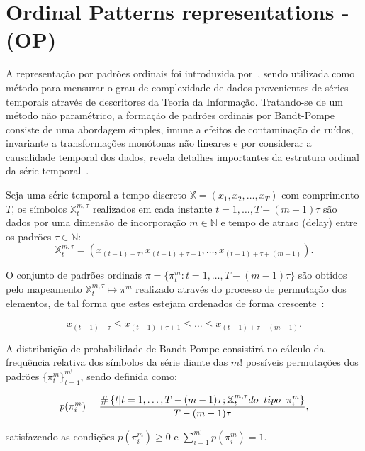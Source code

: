 \documentclass[12pt]{article}
\begin{document}
\section{Ordinal Patterns representations - (OP)}\label{OP}

A representação por padrões ordinais foi introduzida por~\cite{Bandt2002Permutation}, sendo utilizada como método para mensurar o grau de complexidade de dados provenientes de séries temporais através de descritores da Teoria da Informação. 
Tratando-se de um método não paramétrico, a formação de padrões ordinais por Bandt-Pompe consiste de uma abordagem simples, imune a efeitos de contaminação de ruídos, invariante a transformações monótonas não lineares e por considerar a causalidade temporal dos dados, revela detalhes importantes da estrutura ordinal da série temporal~\citep{Larrondo2006Random}.

Seja uma série temporal a tempo discreto $\mathbb{X} = (x_1, x_2, \dots, x_T)$ com comprimento $T$, os símbolos $\mathbb{X}_t^{m,\tau}$ realizados em cada instante $t = 1, \dots, T-(m-1)\tau$ são dados por uma dimensão de incorporação $m \in \mathbb{N}$ e tempo de atraso (delay) entre os padrões $\tau \in \mathbb{N}$: 
\begin{equation}
    \mathbb{X}_t^{m,\tau} = (x_{(t-1)+\tau}, x_{(t-1)+\tau+1},\ldots, x_{(t-1)+\tau+(m-1)}).
\end{equation}

O conjunto de padrões ordinais $\pi = \{\pi_t^m: t = 1, \dots, T-(m-1)\tau\}$ são obtidos pelo mapeamento $\mathbb{X}^{m,\tau}_t \mapsto \pi^m$ realizado através do processo de permutação dos elementos, de tal forma que estes estejam ordenados de forma crescente~\citep{Ravetti2014noise}:

$$ x_{(t-1)+\tau} \leq x_{(t-1)+\tau+1} \leq \ldots \leq x_{(t-1)+\tau+(m-1)}. $$ 

A distribuição de probabilidade de Bandt-Pompe consistirá no cálculo da frequência relativa dos símbolos da série diante das $m!$ possíveis permutações dos padrões $\{\pi_t^m\}_{t=1}^{m!}$, sendo definida como:

\begin{equation}
    p(\pi_i^m) = \frac{\#\left \{t | t = 1, \dots, T-(m-1)\tau; \mathbb{X}_t^{m,\tau} do \hspace{.2cm} tipo \hspace{.2cm} \pi_i^m\right \}}{T- (m-1)\tau},  
\end{equation}

satisfazendo as condições $p(\pi_i^m) \ge 0$ e  $\sum_{i=1}^{m!} p(\pi_i^m) = 1$.
\end{document}
